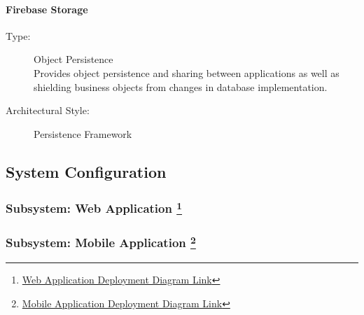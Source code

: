 \documentclass[a4paper, 11pt]{article}
\begin{document}
\paragraph{Firebase Storage}
\begin{description}
  \item[Type:] Object Persistence \\
    Provides object persistence and sharing between applications as well as shielding business objects from changes in database implementation.
  \item[Architectural Style:] Persistence Framework
\end{description}

\subsection{System Configuration}
\subsubsection{Subsystem: Web Application \footnote{\href{https://drive.google.com/file/d/18zQqtAucqqiCR3MjFKOGmN0oieBT_--6/view?usp=sharing}{Web Application Deployment Diagram Link}}}
\begin{center}
\end{center}
\pagebreak

\subsubsection{Subsystem: Mobile Application \protect\footnote{\href{https://drive.google.com/file/d/1TIn16EjUxJmrkHRMWMGpPkpu460Sh4I9/view?usp=sharing}{Mobile Application Deployment Diagram Link}}}
\begin{center}
\end{center}
\pagebreak
\end{document}
